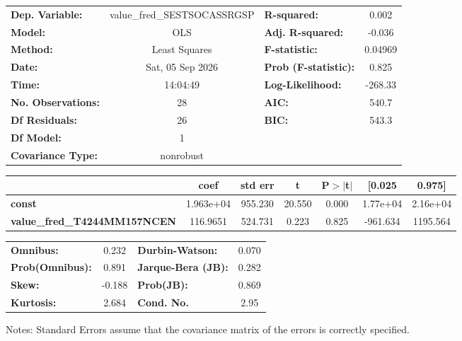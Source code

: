 \begin{center}
\begin{tabular}{lclc}
\toprule
\textbf{Dep. Variable:}              & value\_fred\_SESTSOCASSRGSP & \textbf{  R-squared:         } &     0.002   \\
\textbf{Model:}                      &             OLS             & \textbf{  Adj. R-squared:    } &    -0.036   \\
\textbf{Method:}                     &        Least Squares        & \textbf{  F-statistic:       } &   0.04969   \\
\textbf{Date:}                       &       Sat, 05 Sep 2026      & \textbf{  Prob (F-statistic):} &    0.825    \\
\textbf{Time:}                       &           14:04:49          & \textbf{  Log-Likelihood:    } &   -268.33   \\
\textbf{No. Observations:}           &                28           & \textbf{  AIC:               } &     540.7   \\
\textbf{Df Residuals:}               &                26           & \textbf{  BIC:               } &     543.3   \\
\textbf{Df Model:}                   &                 1           & \textbf{                     } &             \\
\textbf{Covariance Type:}            &          nonrobust          & \textbf{                     } &             \\
\bottomrule
\end{tabular}
\begin{tabular}{lcccccc}
                                     & \textbf{coef} & \textbf{std err} & \textbf{t} & \textbf{P$> |$t$|$} & \textbf{[0.025} & \textbf{0.975]}  \\
\midrule
\textbf{const}                       &    1.963e+04  &      955.230     &    20.550  &         0.000        &     1.77e+04    &     2.16e+04     \\
\textbf{value\_fred\_T4244MM157NCEN} &     116.9651  &      524.731     &     0.223  &         0.825        &     -961.634    &     1195.564     \\
\bottomrule
\end{tabular}
\begin{tabular}{lclc}
\textbf{Omnibus:}       &  0.232 & \textbf{  Durbin-Watson:     } &    0.070  \\
\textbf{Prob(Omnibus):} &  0.891 & \textbf{  Jarque-Bera (JB):  } &    0.282  \\
\textbf{Skew:}          & -0.188 & \textbf{  Prob(JB):          } &    0.869  \\
\textbf{Kurtosis:}      &  2.684 & \textbf{  Cond. No.          } &     2.95  \\
\bottomrule
\end{tabular}
\end{center}

Notes: \newline
 [1] Standard Errors assume that the covariance matrix of the errors is correctly specified.